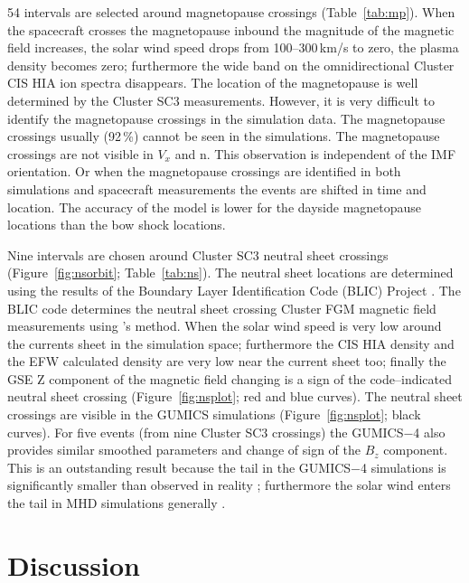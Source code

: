 \documentclass[draft]{agujournal2019}
\begin{document}
54 intervals are selected around magnetopause crossings (Table~\ref{tab:mp}). When the spacecraft crosses the magnetopause inbound the magnitude of the magnetic field increases, the solar wind speed drops from 100--300\,km/s to zero, the plasma density becomes zero; furthermore the wide band on the omnidirectional Cluster CIS HIA ion spectra disappears. The location of the magnetopause is well determined by the Cluster SC3 measurements. However, it is very difficult to identify the magnetopause crossings in the simulation data. The magnetopause crossings usually (92\,\%) cannot be seen in the simulations. The magnetopause crossings are not visible in $V_{x}$ and n. This observation is independent of the IMF orientation. Or when the magnetopause crossings are identified in both simulations and spacecraft measurements the events are shifted in time and location. The accuracy of the model is lower for the dayside magnetopause locations than the bow shock locations. 

Nine intervals are chosen around Cluster SC3 neutral sheet crossings (Figure~\ref{fig:nsorbit}; Table~\ref{tab:ns}). The neutral sheet locations are determined using the results of the Boundary Layer Identification Code (BLIC) Project \cite{facskoon:_bow_clust}. The BLIC code determines the neutral sheet crossing Cluster FGM magnetic field measurements using 's method. When the solar wind speed is very low around the currents sheet in the simulation space; furthermore the CIS HIA density and the EFW calculated density are very low near the current sheet too; finally the GSE Z component of the magnetic field changing is a sign of the code--indicated neutral sheet crossing (Figure~\ref{fig:nsplot}; red and blue curves). The neutral sheet crossings are visible in the GUMICS simulations (Figure~\ref{fig:nsplot}; black curves). For five events (from nine Cluster SC3 crossings) the GUMICS$-$4 also provides similar smoothed parameters and change of sign of the $B_{z}$ component. This is an outstanding result because the tail in the GUMICS$-$4 simulations is significantly smaller than observed in reality \cite{gordeev13:_verif_gumic_mhd,facsko16:_one_earth}; furthermore the solar wind enters the tail in MHD simulations generally \cite{kallio15:_proper}.

\section{Discussion}
\label{sec:discussion}
\end{document}

